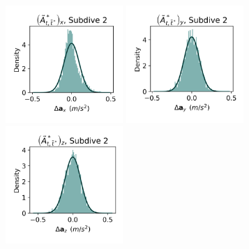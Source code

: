 \documentclass{article}
\begin{document}
\begin{center}
        \includegraphics[width=1.75in]{../Plots/2019/20190902-182840-CATs_OB_1_0_267_CarHHMM2_empirical_hist_Ax_1.png}
        \includegraphics[width=1.75in]{../Plots/2019/20190902-182840-CATs_OB_1_0_267_CarHHMM2_empirical_hist_Ay_1.png}
        \includegraphics[width=1.75in]{../Plots/2019/20190902-182840-CATs_OB_1_0_267_CarHHMM2_empirical_hist_Az_1.png}
        

\end{center}
\end{document}
